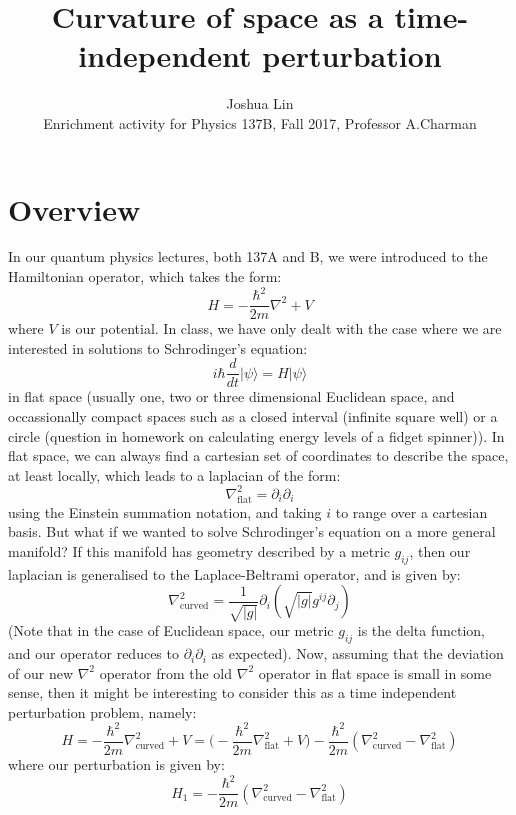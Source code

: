 \documentclass[12pt]{article}
\newenvironment{problem}[2][Exercise]{\begin{trivlist}
\item[\hskip \labelsep {\bfseries #1}\hskip \labelsep {\bfseries #2.}]}{\end{trivlist}}
\renewenvironment{proof}{{\bfseries Solution:}}{}
\begin{document}
      
\title{Curvature of space as a time-independent perturbation}
\author{Joshua Lin\\Enrichment activity for Physics 137B, Fall 2017, Professor A.Charman}

\maketitle
       

        


\section{Overview}

In our quantum physics lectures, both 137A and B, we were introduced to the Hamiltonian operator, which takes the form:
$$H = - \frac{\hbar^2}{2m} \nabla^2 + V$$
where $V$ is our potential. In class, we have only dealt with the case where we are interested in solutions to Schrodinger's equation:
$$i \hbar \frac{d}{dt} | \psi \rangle = H | \psi \rangle$$
in flat space (usually one, two or three dimensional Euclidean space, and occassionally compact spaces such as a closed interval (infinite square well) or a circle (question in homework on calculating energy levels of a fidget spinner)). In flat space, we can always find a cartesian set of coordinates to describe the space, at least locally, which leads to a laplacian of the form:
$$\nabla^2_{\text{flat}} = \partial_i \partial_i$$
using the Einstein summation notation, and taking $i$ to range over a cartesian basis. But what if we wanted to solve Schrodinger's equation on a more general manifold? If this manifold has geometry described by a metric $g_{ij}$, then our laplacian is generalised to the Laplace-Beltrami operator, and is given by:
$$\nabla^2_{\text{curved}} = \frac{1}{\sqrt{|g|}} \partial_i (\sqrt{|g|} g^{ij} \partial_j)$$
(Note that in the case of Euclidean space, our metric $g_{ij}$ is the delta function, and our operator reduces to $\partial_i \partial_i$ as expected). Now, assuming that the deviation of our new $\nabla^2$ operator from the old $\nabla^2$ operator in flat space is small in some sense, then it might be interesting to consider this as a time independent perturbation problem, namely:
$$H = - \frac{\hbar^2}{2m} \nabla^2_{\text{curved}} + V = \bigg(- \frac{\hbar^2}{2m} \nabla^2_{\text{flat}} + V\bigg) - \frac{\hbar^2}{2m} (\nabla^2_{\text{curved}} - \nabla^2_{\text{flat}})$$
where our perturbation is given by:
$$H_1 = -\frac{\hbar^2}{2m} (\nabla^2_{\text{curved}} - \nabla^2_{\text{flat}})$$
\end{document}
